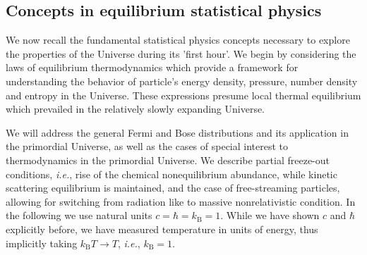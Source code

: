 \subsection{Concepts in equilibrium statistical physics} \label{sec:statphys}
We now recall the fundamental statistical physics concepts necessary to explore the properties of the Universe during its 'first hour'. {\color{black} We begin by considering the laws of equilibrium thermodynamics which provide a framework for understanding the behavior of particle's energy density, pressure, number density and entropy in the Universe. These expressions presume local thermal equilibrium which prevailed in the relatively slowly expanding Universe.}

We will address the general Fermi and Bose distributions and its application in the primordial Universe, as well as the cases of special interest to thermodynamics in the primordial Universe. We describe partial freeze-out conditions, {\it i.e.\/}, rise of the chemical nonequilibrium abundance, while kinetic scattering equilibrium is maintained, and the case of free-streaming particles, allowing for switching from radiation like to massive nonrelativistic condition. In the following we use natural units $c=\hbar=k_\mathrm{B}=1$. While we have shown  $c$ and $\hbar$ explicitly before, we have measured temperature in units of energy, thus implicitly taking $k_\mathrm{B}T\to T$, {\it i.e.\/}, $k_\mathrm{B}=1$.

